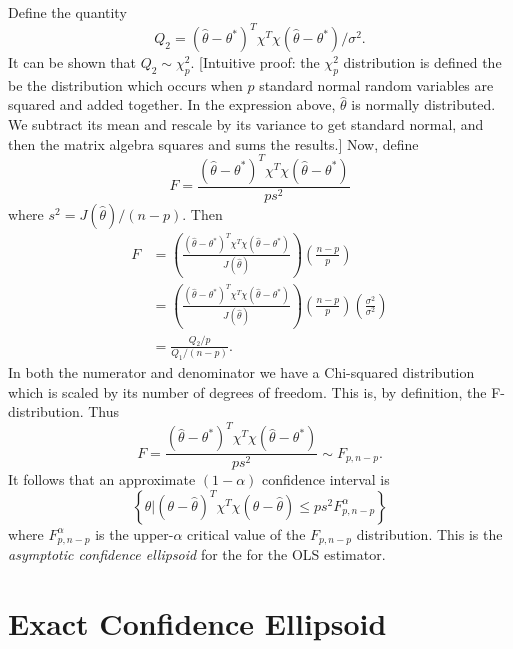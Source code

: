 \documentclass[10pt]{article}
\begin{document}
Define the quantity
\begin{equation*}
Q_{2} = (\hat{\theta} - \theta^{*})^{T}\chi^{T}\chi(\hat{\theta} - \theta^{*})/\sigma^{2}.
\end{equation*}
It can be shown \cite[Thm. 2.9]{SeberLee} that $Q_{2} \sim \chi^{2}_{p}$.  [Intuitive proof: the $\chi^{2}_{p}$ distribution is defined the be the distribution which occurs when $p$ standard normal random variables are squared and added together.  In the expression above, $\hat{\theta}$ is normally distributed.  We subtract its mean and rescale by its variance to get standard normal, and then the matrix algebra squares and sums the results.]  Now, define
\begin{equation}\label{eq:F_def}
F = \frac{(\hat{\theta} - \theta^{*})^{T}\chi^{T}\chi(\hat{\theta} - \theta^{*})}{ps^{2}}
\end{equation}
where $s^{2} = J(\hat{\theta})/(n-p)$.  Then
\begin{align*}
F & = \left(\frac{(\hat{\theta} - \theta^{*})^{T}\chi^{T}\chi(\hat{\theta} - \theta^{*})}{J(\hat{\theta})}\right)\left(\frac{n-p}{p}\right)\\
	& = \left(\frac{(\hat{\theta} - \theta^{*})^{T}\chi^{T}\chi(\hat{\theta} - \theta^{*})}{J(\hat{\theta})}\right)\left(\frac{n-p}{p}\right)\left(\frac{\sigma^{2}}{\sigma^{2}}\right)\\
& = \frac{Q_{2}/p}{Q_{1}/(n-p)}.
\end{align*}
In both the numerator and denominator we have a Chi-squared distribution which is scaled by its number of degrees of freedom.  This is, by definition, the F-distribution.  Thus
\begin{equation}\label{eq:F_dist}
F = \frac{(\hat{\theta} - \theta^{*})^{T}\chi^{T}\chi(\hat{\theta} - \theta^{*})}{ps^{2}} \sim F_{p,n-p}.
\end{equation}
It follows that an approximate $(1-\alpha)$ confidence interval is
\begin{equation}\label{eq:ellipsoid1}
\left\{\theta \Big| (\theta - \hat{\theta})^{T}\chi^{T}\chi(\theta - \hat{\theta}) \leq ps^{2}F_{p,n-p}^{\alpha}\right\}
\end{equation}
where $F_{p,n-p}^{\alpha}$ is the upper-$\alpha$ critical value of the $F_{p,n-p}$ distribution.  This is the \emph{asymptotic confidence ellipsoid} for the for the OLS estimator.



\section{Exact Confidence Ellipsoid}
\end{document}
